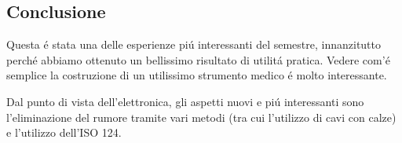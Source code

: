 \subsection{Conclusione}

Questa é stata una delle esperienze piú interessanti del semestre, innanzitutto
perché abbiamo ottenuto un bellissimo risultato di utilitá pratica. Vedere
com'é semplice la costruzione di un utilissimo strumento medico é molto interessante.

Dal punto di vista dell'elettronica, gli aspetti nuovi e piú interessanti sono
l'eliminazione del rumore tramite vari metodi (tra cui l'utilizzo di cavi con
calze) e l'utilizzo dell'ISO 124.
